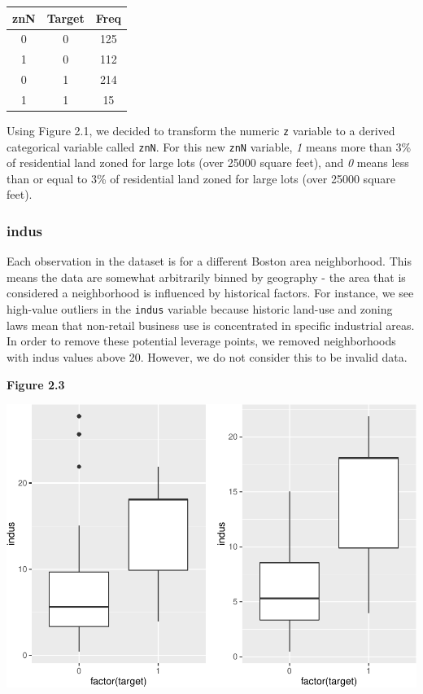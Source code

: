 \documentclass[]{article}
\begin{document}
\begin{longtable}[c]{@{}ccc@{}}
\toprule
znN & Target & Freq\tabularnewline
\midrule
\endhead
0 & 0 & 125\tabularnewline
1 & 0 & 112\tabularnewline
0 & 1 & 214\tabularnewline
1 & 1 & 15\tabularnewline
\bottomrule
\end{longtable}

Using Figure 2.1, we decided to transform the numeric \texttt{z}
variable to a derived categorical variable called \texttt{znN}. For this
new \texttt{znN} variable, \emph{1} means more than 3\% of residential
land zoned for large lots (over 25000 square feet), and \emph{0} means
less than or equal to 3\% of residential land zoned for large lots (over
25000 square feet).

\subsubsection{indus}\label{indus}

Each observation in the dataset is for a different Boston area
neighborhood. This means the data are somewhat arbitrarily binned by
geography - the area that is considered a neighborhood is influenced by
historical factors. For instance, we see high-value outliers in the
\texttt{indus} variable because historic land-use and zoning laws mean
that non-retail business use is concentrated in specific industrial
areas. In order to remove these potential leverage points, we removed
neighborhoods with indus values above 20. However, we do not consider
this to be invalid data.

\pagebreak  

\textbf{Figure 2.3}

\includegraphics{HW3_Final_files/figure-latex/unnamed-chunk-6-1.pdf}
\end{document}
